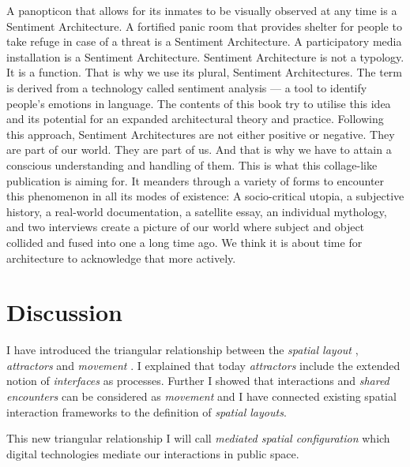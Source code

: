 A panopticon that allows for its inmates to be visually observed at any time is a Sentiment Architecture. 
A fortified panic room that provides shelter for people to take refuge in case of a threat is a Sentiment Architecture. 
A participatory media installation is a Sentiment Architecture. 
Sentiment Architecture is not a typology.
It is a function. That is why we use its plural, Sentiment Architectures.
The term is derived from a technology called sentiment analysis — a tool to identify people’s emotions in language. 
The contents of this book try to utilise this idea and its potential for an expanded architectural theory and practice. 
Following this approach, Sentiment Architectures are not either positive or negative. 
They are part of our world. They are part of us. 
And that is why we have to attain a conscious understanding and handling of them. 
This is what this collage-like publication is aiming for.
It meanders through a variety of forms to encounter this phenomenon in all its modes of existence: A socio-critical utopia, a subjective history, a real-world documentation, a satellite essay, an individual mythology, and two interviews create a picture of our world where subject and object collided and fused into one a long time ago. 
We think it is about time for architecture to acknowledge that more actively.


\section {Discussion}


I have introduced the triangular relationship between the \textit{spatial layout} , \textit{attractors}  and \textit{movement} . I explained that today \textit{attractors} include the extended notion of \textit{interfaces}  as processes. Further I showed that interactions and \textit{shared encounters}  can be considered as \textit{movement} and I have connected existing spatial interaction frameworks to the definition of \textit{spatial layouts}.  


This new triangular relationship I will call \textit{mediated spatial configuration}  which digital technologies mediate our interactions in public space.


